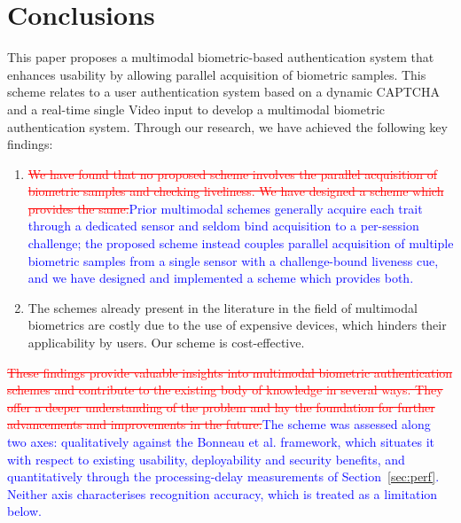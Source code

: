 \documentclass[10pt,journal,compsoc]{IEEEtran}
\begin{document}
\section{Conclusions}
This paper proposes a multimodal biometric-based authentication system that enhances usability by allowing parallel acquisition of biometric samples. This scheme relates to a user authentication system based on a dynamic CAPTCHA and a real-time single Video input to develop a multimodal biometric authentication system. Through our research, we have achieved the following key findings:
\begin{enumerate}
    \item \textcolor{red}{\sout{We have found that no proposed scheme involves the parallel acquisition of biometric samples and checking liveliness. We have designed a scheme which provides the same.}}\textcolor{blue}{Prior multimodal schemes generally acquire each trait through a dedicated sensor and seldom bind acquisition to a per-session challenge; the proposed scheme instead couples parallel acquisition of multiple biometric samples from a single sensor with a challenge-bound liveness cue, and we have designed and implemented a scheme which provides both.}
    \item The schemes already present in the literature in the field of multimodal biometrics are costly due to the use of expensive devices, which hinders their applicability by users. Our scheme is cost-effective.
\end{enumerate}
\textcolor{red}{\sout{These findings provide valuable insights into multimodal biometric authentication schemes and contribute to the existing body of knowledge in several ways. They offer a deeper understanding of the problem and lay the foundation for further advancements and improvements in the future.}}\textcolor{blue}{The scheme was assessed along two axes: qualitatively against the Bonneau et al. framework, which situates it with respect to existing usability, deployability and security benefits, and quantitatively through the processing-delay measurements of Section~\ref{sec:perf}. Neither axis characterises recognition accuracy, which is treated as a limitation below.}\\
\end{document}
